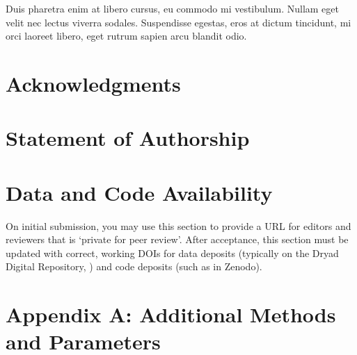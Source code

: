 \documentclass[11pt]{article}
\begin{document}
	Duis pharetra enim at libero cursus, eu commodo mi vestibulum. Nullam eget velit nec lectus viverra sodales. Suspendisse egestas, eros at dictum tincidunt, mi orci laoreet libero, eget rutrum sapien arcu blandit odio.
	
	
	\section*{Acknowledgments}


	
	\section*{Statement of Authorship}
	

	
	\section*{Data and Code Availability}
	
	On initial submission, you may use this section to provide a URL for editors and reviewers that is `private for peer review'. After acceptance, this section must be updated with correct, working DOIs for data deposits (typically on the Dryad Digital Repository, \citealt{CookEtAl2015}) and code deposits (such as in Zenodo). 
	
	\section*{Appendix A: Additional Methods and Parameters}
	
\end{document}
